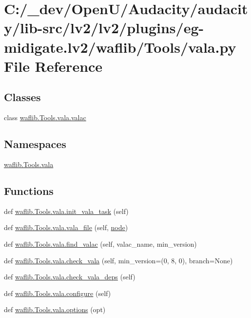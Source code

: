 \hypertarget{lv2_2plugins_2eg-midigate_8lv2_2waflib_2_tools_2vala_8py}{}\section{C\+:/\+\_\+dev/\+Open\+U/\+Audacity/audacity/lib-\/src/lv2/lv2/plugins/eg-\/midigate.lv2/waflib/\+Tools/vala.py File Reference}
\label{lv2_2plugins_2eg-midigate_8lv2_2waflib_2_tools_2vala_8py}
\subsection*{Classes}
\begin{DoxyCompactItemize}
\item 
class \hyperlink{classwaflib_1_1_tools_1_1vala_1_1valac}{waflib.\+Tools.\+vala.\+valac}
\end{DoxyCompactItemize}
\subsection*{Namespaces}
\begin{DoxyCompactItemize}
\item 
 \hyperlink{namespacewaflib_1_1_tools_1_1vala}{waflib.\+Tools.\+vala}
\end{DoxyCompactItemize}
\subsection*{Functions}
\begin{DoxyCompactItemize}
\item 
def \hyperlink{namespacewaflib_1_1_tools_1_1vala_afedcf657dff8a988abdf3f52dc1b1584}{waflib.\+Tools.\+vala.\+init\+\_\+vala\+\_\+task} (self)
\item 
def \hyperlink{namespacewaflib_1_1_tools_1_1vala_a6baf611b698503ed4c43e8ff2e870acd}{waflib.\+Tools.\+vala.\+vala\+\_\+file} (self, \hyperlink{structnode}{node})
\item 
def \hyperlink{namespacewaflib_1_1_tools_1_1vala_afcb54ec67c0f38a26b8cf34ae9c89b7b}{waflib.\+Tools.\+vala.\+find\+\_\+valac} (self, valac\+\_\+name, min\+\_\+version)
\item 
def \hyperlink{namespacewaflib_1_1_tools_1_1vala_a3093897181665808445ee213a19a6d64}{waflib.\+Tools.\+vala.\+check\+\_\+vala} (self, min\+\_\+version=(0, 8, 0), branch=None)
\item 
def \hyperlink{namespacewaflib_1_1_tools_1_1vala_a0e50168b039627d93b07929537af57af}{waflib.\+Tools.\+vala.\+check\+\_\+vala\+\_\+deps} (self)
\item 
def \hyperlink{namespacewaflib_1_1_tools_1_1vala_aa13ac0bb84782b53e5cf4761adb55657}{waflib.\+Tools.\+vala.\+configure} (self)
\item 
def \hyperlink{namespacewaflib_1_1_tools_1_1vala_a17771e1da92206049384a4fea5523b78}{waflib.\+Tools.\+vala.\+options} (opt)
\end{DoxyCompactItemize}
